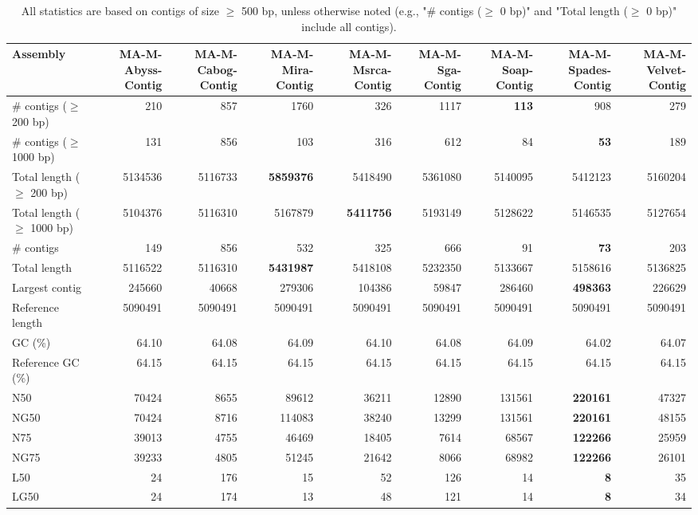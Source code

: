 \documentclass[12pt,a4paper]{article}
\begin{document}
\begin{table}[ht]
\begin{center}
\caption{All statistics are based on contigs of size $\geq$ 500 bp, unless otherwise noted (e.g., "\# contigs ($\geq$ 0 bp)" and "Total length ($\geq$ 0 bp)" include all contigs).}
\begin{tabular}{|l*{8}{|r}|}
\hline
Assembly & MA-M-Abyss-Contig & MA-M-Cabog-Contig & MA-M-Mira-Contig & MA-M-Msrca-Contig & MA-M-Sga-Contig & MA-M-Soap-Contig & MA-M-Spades-Contig & MA-M-Velvet-Contig \\ \hline
\# contigs ($\geq$ 200 bp) & 210 & 857 & 1760 & 326 & 1117 & {\bf 113} & 908 & 279 \\ \hline
\# contigs ($\geq$ 1000 bp) & 131 & 856 & 103 & 316 & 612 & 84 & {\bf 53} & 189 \\ \hline
Total length ($\geq$ 200 bp) & 5134536 & 5116733 & {\bf 5859376} & 5418490 & 5361080 & 5140095 & 5412123 & 5160204 \\ \hline
Total length ($\geq$ 1000 bp) & 5104376 & 5116310 & 5167879 & {\bf 5411756} & 5193149 & 5128622 & 5146535 & 5127654 \\ \hline
\# contigs & 149 & 856 & 532 & 325 & 666 & 91 & {\bf 73} & 203 \\ \hline
Total length & 5116522 & 5116310 & {\bf 5431987} & 5418108 & 5232350 & 5133667 & 5158616 & 5136825 \\ \hline
Largest contig & 245660 & 40668 & 279306 & 104386 & 59847 & 286460 & {\bf 498363} & 226629 \\ \hline
Reference length & 5090491 & 5090491 & 5090491 & 5090491 & 5090491 & 5090491 & 5090491 & 5090491 \\ \hline
GC (\%) & 64.10 & 64.08 & 64.09 & 64.10 & 64.08 & 64.09 & 64.02 & 64.07 \\ \hline
Reference GC (\%) & 64.15 & 64.15 & 64.15 & 64.15 & 64.15 & 64.15 & 64.15 & 64.15 \\ \hline
N50 & 70424 & 8655 & 89612 & 36211 & 12890 & 131561 & {\bf 220161} & 47327 \\ \hline
NG50 & 70424 & 8716 & 114083 & 38240 & 13299 & 131561 & {\bf 220161} & 48155 \\ \hline
N75 & 39013 & 4755 & 46469 & 18405 & 7614 & 68567 & {\bf 122266} & 25959 \\ \hline
NG75 & 39233 & 4805 & 51245 & 21642 & 8066 & 68982 & {\bf 122266} & 26101 \\ \hline
L50 & 24 & 176 & 15 & 52 & 126 & 14 & {\bf 8} & 35 \\ \hline
LG50 & 24 & 174 & 13 & 48 & 121 & 14 & {\bf 8} & 34 \\ \hline

\end{tabular}
\end{center}
\end{table}
\end{document}
